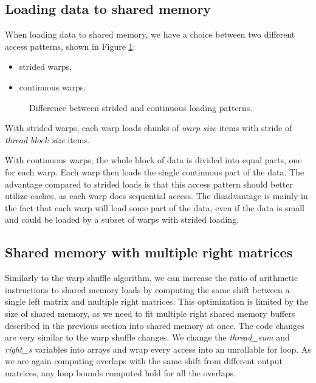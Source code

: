 \subsection{Loading data to shared memory}

When loading data to shared memory, we have a choice between two different access patterns, shown in Figure \ref{fig:shared_memory_loading_patterns}:
\begin{itemize}
	\item strided warps,
	\item continuous warps.
\end{itemize}

\begin{figure}[ht]
	\centering
	\def\svgwidth{0.4\textwidth}
	\fontsize{8}{10}\selectfont
	
	\caption{Difference between strided and continuous loading patterns.}
	\label{fig:shared_memory_loading_patterns}
\end{figure}

With strided warps, each warp loads chunks of \textit{warp size} items with stride of \textit{thread block size} items. 

With continuous warps, the whole block of data is divided into equal parts, one for each warp. Each warp then loads the single continuous part of the data. The advantage compared to strided loads is that this access pattern should better utilize caches, as each warp does sequential access. The disadvantage is mainly in the fact that each warp will load some part of the data, even if the data is small and could be loaded by a subset of warps with strided loading. %

\subsection{Shared memory with multiple right matrices}

Similarly to the warp shuffle algorithm, we can increase the ratio of arithmetic instructions to shared memory loads by computing the same shift between a single left matrix and multiple right matrices. This optimization is limited by the size of shared memory, as we need to fit multiple right shared memory buffers described in the previous section into shared memory at once. The code changes are very similar to the warp shuffle changes. We change the \textit{thread\_sum} and \textit{right\_s} variables into arrays and wrap every access into an unrollable for loop. As we are again computing overlaps with the same shift from different output matrices, any loop bounds computed hold for all the overlaps.

